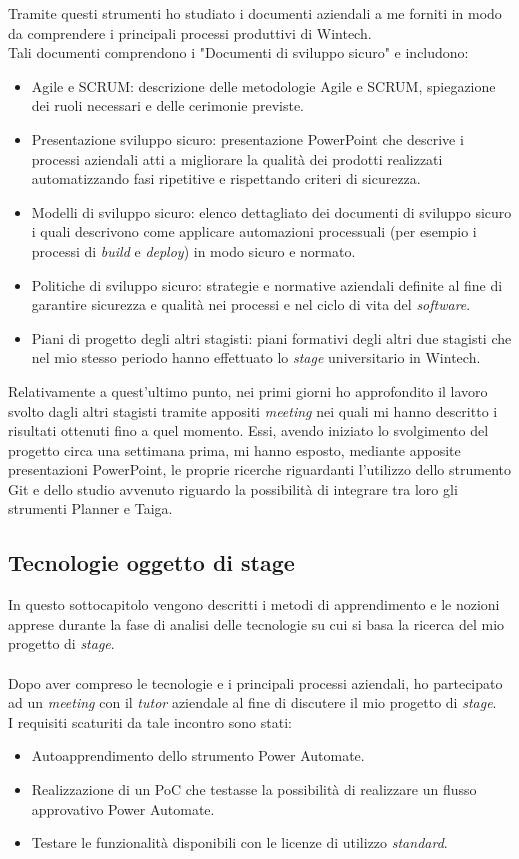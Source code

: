 Tramite questi strumenti ho studiato i documenti aziendali a me forniti in modo da comprendere i principali processi produttivi di Wintech.\\ 
Tali documenti comprendono i "Documenti di sviluppo sicuro" e includono:
\begin{itemize}
    \item Agile e SCRUM: descrizione delle metodologie Agile e SCRUM, spiegazione dei ruoli necessari e delle cerimonie previste. 
    \item Presentazione sviluppo sicuro: presentazione PowerPoint che descrive i processi aziendali atti a migliorare la qualità dei prodotti realizzati automatizzando fasi ripetitive e rispettando criteri di sicurezza. 
    \item Modelli di sviluppo sicuro: elenco dettagliato dei documenti di sviluppo sicuro i quali descrivono come applicare automazioni processuali (per esempio i processi di \emph{build} e \emph{deploy}) in modo sicuro e normato. 
    \item Politiche di sviluppo sicuro: strategie e normative aziendali definite al fine di garantire sicurezza e qualità nei processi e nel ciclo di vita del \emph{software}. 
    \item Piani di progetto degli altri stagisti: piani formativi degli altri due stagisti che nel mio stesso periodo hanno effettuato lo \emph{stage} universitario in Wintech. 
\end{itemize}
Relativamente a quest'ultimo punto, nei primi giorni ho approfondito il lavoro svolto dagli altri stagisti tramite appositi \emph{meeting} nei quali mi hanno descritto i risultati ottenuti fino a quel momento. Essi, avendo iniziato lo svolgimento del progetto circa una settimana prima, mi hanno esposto, mediante apposite presentazioni PowerPoint, le proprie ricerche riguardanti l'utilizzo dello strumento Git e dello studio avvenuto riguardo la possibilità di integrare tra loro gli strumenti Planner e Taiga. 

\subsection{Tecnologie oggetto di stage}
In questo sottocapitolo vengono descritti i metodi di apprendimento e le nozioni apprese durante la fase di analisi delle tecnologie su cui si basa la ricerca del mio progetto di \emph{stage}.\\\\
Dopo aver compreso le tecnologie e i principali processi aziendali, ho partecipato ad un \emph{meeting} con il \emph{tutor} aziendale al fine di discutere il mio progetto di \emph{stage}.\\
I requisiti scaturiti da tale incontro sono stati: 
\begin{itemize}
    \item Autoapprendimento dello strumento Power Automate.
    \item Realizzazione di un PoC che testasse la possibilità di realizzare un flusso approvativo Power Automate. 
    \item Testare le funzionalità disponibili con le licenze di utilizzo \emph{standard}. 
\end{itemize}

